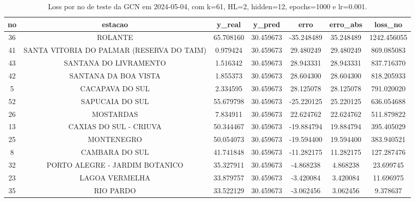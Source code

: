 \begin{table}[h]
\centering
\caption{Loss por no de teste da GCN em 2024-05-04, com k=61, HL=2, hidden=12, epochs=1000 e lr=0.001.}
\label{tab:gcn_loss_k61_hl2_h12_e1000_d20240504}
\begin{tabular}{ccccccc}
\toprule
no & estacao & y\_real & y\_pred & erro & erro\_abs & loss\_no \\
\midrule
36 & ROLANTE & 65.708160 & 30.459673 & -35.248489 & 35.248489 & 1242.456055 \\
41 & SANTA VITORIA DO PALMAR (RESERVA DO TAIM) & 0.979424 & 30.459673 & 29.480249 & 29.480249 & 869.085083 \\
43 & SANTANA DO LIVRAMENTO & 1.516342 & 30.459673 & 28.943331 & 28.943331 & 837.716370 \\
42 & SANTANA DA BOA VISTA & 1.855373 & 30.459673 & 28.604300 & 28.604300 & 818.205933 \\
5 & CACAPAVA DO SUL & 2.334595 & 30.459673 & 28.125078 & 28.125078 & 791.020020 \\
52 & SAPUCAIA DO SUL & 55.679798 & 30.459673 & -25.220125 & 25.220125 & 636.054688 \\
26 & MOSTARDAS & 7.834911 & 30.459673 & 22.624762 & 22.624762 & 511.879822 \\
13 & CAXIAS DO SUL - CRIUVA & 50.344467 & 30.459673 & -19.884794 & 19.884794 & 395.405029 \\
25 & MONTENEGRO & 50.054073 & 30.459673 & -19.594400 & 19.594400 & 383.940521 \\
8 & CAMBARA DO SUL & 41.741848 & 30.459673 & -11.282175 & 11.282175 & 127.287476 \\
32 & PORTO ALEGRE - JARDIM BOTANICO & 35.327911 & 30.459673 & -4.868238 & 4.868238 & 23.699745 \\
23 & LAGOA VERMELHA & 33.879757 & 30.459673 & -3.420084 & 3.420084 & 11.696975 \\
35 & RIO PARDO & 33.522129 & 30.459673 & -3.062456 & 3.062456 & 9.378637 \\
\bottomrule
\end{tabular}
\end{table}
